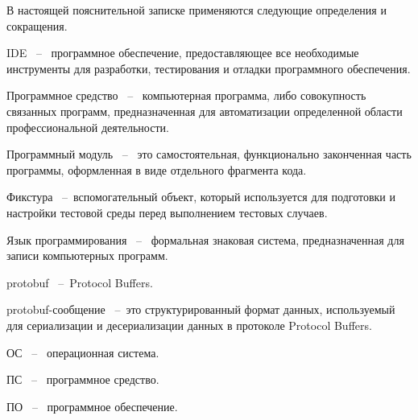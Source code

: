 
В настоящей пояснительной записке применяются следующие
определения и сокращения.

IDE ~--~ программное обеспечение, предоставляющее все необходимые
инструменты для разработки, тестирования и отладки программного
обеспечения.

Программное средство ~--~ компьютерная программа, либо совокупность
связанных программ, предназначенная для автоматизации определенной
области профессиональной деятельности.

Программный модуль ~--~ это самостоятельная, функционально законченная часть программы, оформленная в виде отдельного фрагмента кода.

Фикстура ~--~вспомогательный объект, который используется для подготовки и настройки тестовой среды перед выполнением тестовых случаев.

Язык программирования ~--~ формальная знаковая система,
предназначенная для записи компьютерных программ.

protobuf ~--~Protocol Buffers.

protobuf-сообщение ~--~это структурированный формат данных, используемый для сериализации и десериализации данных в протоколе Protocol Buffers.

ОС ~--~ операционная система.

ПС ~--~ программное средство.

ПО ~--~ программное обеспечение.

\thispagestyle{empty}

\pagebreak
